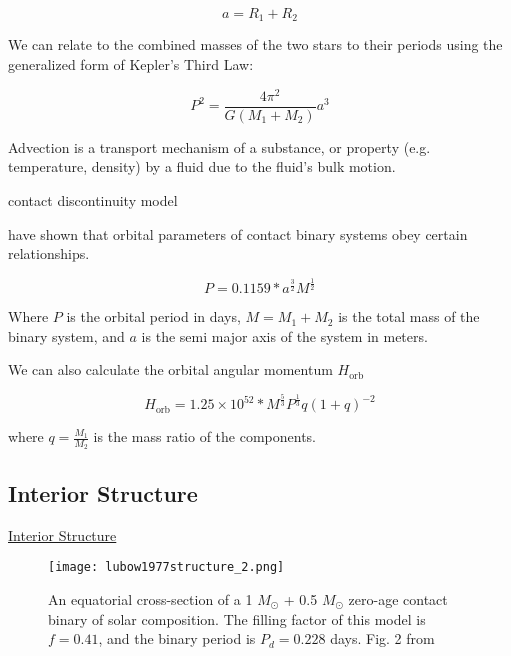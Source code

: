\documentclass[12pt]{article} %
\numberwithin{equation}{section} %
\begin{document}
\begin{equation} \label{eqn: contact_criterion}
a = R_{1} + R_{2}
\end{equation}

We can relate to the combined masses of the two stars to their periods using the generalized form of Kepler's Third Law: 

\begin{equation} \label{eqn: kepler3}
P^{2} = \frac{4\pi^{2}}{G(M_{1} + M_{2})} a^{3}
\end{equation}


Advection is a transport mechanism of a substance, or property (e.g. temperature, density) by a fluid due to the fluid's bulk motion.

\citep{shu1976structure} contact discontinuity model

\citep{lubow1977structure}

\citet{gazeas2008angular} have shown that orbital parameters of contact binary systems obey certain relationships.

\begin{equation} \label{gazeas2008angular_6}
P = 0.1159 * a^{\frac{3}{2}} M^{\frac{1}{2}}
\end{equation}

Where $P$ is the orbital period in days, $M = M_{1} + M_{2}$ is the total mass of the binary system, and $a$ is the semi major axis of the system in meters.

We can also calculate the orbital angular momentum $H_{\text{orb}}$ 

\begin{equation} \label{gazeas2008angular_7}
H_{\text{orb}} = 1.25 \times 10^{52} * M^{\frac{5}{3}} P^{\frac{1}{3}} q(1 + q)^{-2}
\end{equation}

where $q = \frac{M_{1}}{M_{2}}$ is the mass ratio of the components.


\citep{gazeas2006masses}

\subsection{Interior Structure}{\hyperlink{toc}{Interior Structure}} \label{sec: Interior Structure}

\begin{figure}[H]
\centering
\texttt{[image: lubow1977structure\_2.png]}
\caption{An equatorial cross-section of a 1 $M_{\odot}$ + 0.5 $M_{\odot}$ zero-age contact binary of solar composition. The filling factor of this model is $f = 0.41$, and the binary period is $P_{d} = 0.228$ days. Fig. 2 from \citet{lubow1977structure}}
\label{fig: lubow1977structure_2}
\end{figure}
\end{document}

